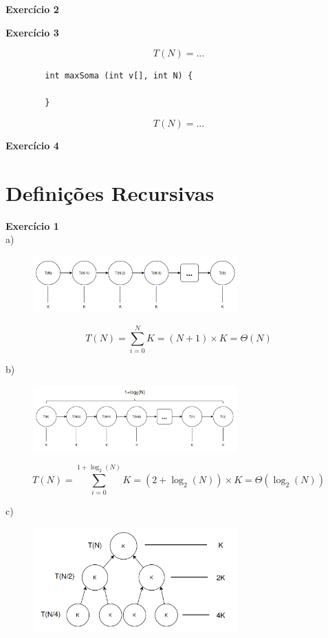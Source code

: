 \documentclass[a4paper,11pt]{article}
\begin{document}
	
	\noindent \textbf{Exercício 2}
	
	\noindent \textbf{Exercício 3}
	
	\[
	T(N) = ...
	\]
	
	\begin{verbatim}
		int maxSoma (int v[], int N) {
			
		}
	\end{verbatim}
	
	\[
	T(N) = ...
	\]
	
	
	\noindent \textbf{Exercício 4}
	
	\section{Definições Recursivas}
	
	\noindent \textbf{Exercício 1}\\
	
	\noindent a)
	
	\begin{figure}[h]
		\centering
		\includegraphics[width=0.7\textwidth]{imgs/2_1-a}
		\label{fig:2_1-a}
	\end{figure}
	
	\[
		T(N) = \sum_{i=0}^{N} K = (N + 1) \times K = \Theta(N)
	\]
	
	\noindent b)
	
	\begin{figure}[h]
		\centering
		\includegraphics[width=0.7\textwidth]{imgs/2_1-b}
		\label{fig:2_1-b}
	\end{figure}
	
	\[
		T(N) = \sum_{i=0}^{1 + \log_2(N)} K = (2 + \log_2(N)) \times K = \Theta(\log_2(N))
	\]
	
	\noindent c)
	
	\begin{figure}[h]
		\centering
		\includegraphics[width=0.7\textwidth]{imgs/2_1-c}
		\label{fig:2_1-c}
	\end{figure}
	
\end{document}
